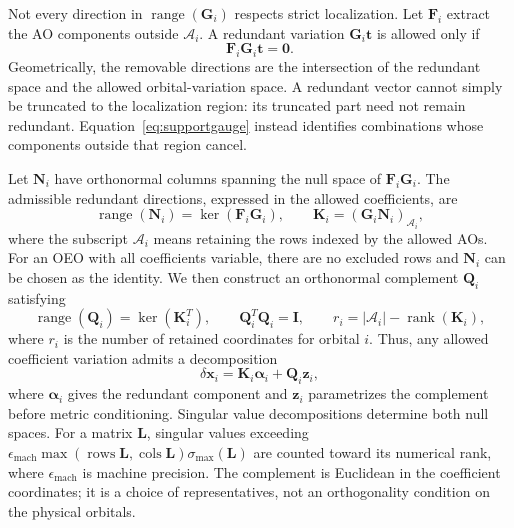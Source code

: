 \documentclass[12pt]{article}
\begin{document}
Not every direction in \(\operatorname{range}(\mathbf G_i)\) respects strict localization. Let \(\mathbf F_i\) extract the AO components outside \(\mathcal A_i\). A redundant variation \(\mathbf G_i\mathbf t\) is allowed only if
\begin{equation}
 \mathbf F_i\mathbf G_i\mathbf t=\mathbf 0.
 \label{eq:supportgauge}
\end{equation}
Geometrically, the removable directions are the intersection of the redundant space and the allowed orbital-variation space. A redundant vector cannot simply be truncated to the localization region: its truncated part need not remain redundant. Equation~\eqref{eq:supportgauge} instead identifies combinations whose components outside that region cancel.

Let \(\mathbf N_i\) have orthonormal columns spanning the null space of \(\mathbf F_i\mathbf G_i\). The admissible redundant directions, expressed in the allowed coefficients, are
\begin{equation}
 \operatorname{range}(\mathbf N_i)=\ker(\mathbf F_i\mathbf G_i),
 \qquad
 \mathbf K_i=(\mathbf G_i\mathbf N_i)_{\mathcal A_i},
 \label{eq:admissiblegauge}
\end{equation}
where the subscript \(\mathcal A_i\) means retaining the rows indexed by the allowed AOs. For an OEO with all coefficients variable, there are no excluded rows and \(\mathbf N_i\) can be chosen as the identity. We then construct an orthonormal complement \(\mathbf Q_i\) satisfying
\begin{equation}
 \operatorname{range}(\mathbf Q_i)=\ker(\mathbf K_i^T),
 \qquad
 \mathbf Q_i^T\mathbf Q_i=\mathbf I,\qquad
 r_i=|\mathcal A_i|-\operatorname{rank}(\mathbf K_i),
 \label{eq:quotientbasis}
\end{equation}
where \(r_i\) is the number of retained coordinates for orbital \(i\). Thus, any allowed coefficient variation admits a decomposition
\begin{equation}
 \delta\mathbf x_i
 =\mathbf K_i\boldsymbol\alpha_i+\mathbf Q_i\mathbf z_i,
 \label{eq:quotientdecomposition}
\end{equation}
where \(\boldsymbol\alpha_i\) gives the redundant component and \(\mathbf z_i\) parametrizes the complement before metric conditioning. Singular value decompositions determine both null spaces. For a matrix \(\mathbf L\), singular values exceeding
\(\epsilon_{\mathrm{mach}}\max(\operatorname{rows}\mathbf L,\operatorname{cols}\mathbf L)\sigma_{\max}(\mathbf L)\)
are counted toward its numerical rank, where \(\epsilon_{\mathrm{mach}}\) is machine precision. The complement is Euclidean in the coefficient coordinates; it is a choice of representatives, not an orthogonality condition on the physical orbitals.
\end{document}
